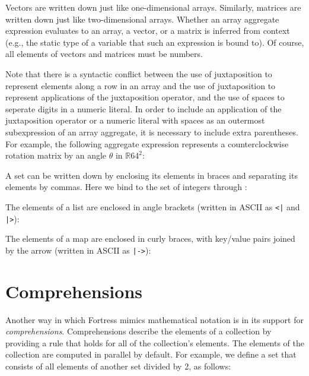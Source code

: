 Vectors are written down just like one-dimensional arrays.
Similarly, matrices are written down just like two-dimensional arrays.
Whether an array aggregate expression evaluates to an array, a vector, or a
matrix is inferred from context
(e.g., the static type of a variable that such an expression is bound to).
Of course, all elements of vectors and matrices must be numbers.

Note that there is a syntactic conflict between the use of juxtaposition to
represent elements along a row in an array and the use of juxtaposition to represent
applications of the juxtaposition operator, and the use of spaces to seperate digits in a numeric literal.
In order to include an application of the juxtaposition operator or a numeric literal with spaces
as an outermost subexpression of an array aggregate, it is necessary to include extra parentheses. For example,
the following aggregate expression represents a counterclockwise rotation matrix by an angle $\theta{}$ in $\mathbb{R}64^2$:




A set can be written down by enclosing its elements in braces and separating its elements by commas.
Here we bind  to the set of integers  through :



The elements of a list are enclosed in angle brackets (written in ASCII as
\verb$<|$ and \verb$|>$):


The elements of a map are enclosed in curly braces, with key/value pairs
joined by the arrow \EXP{\mapsto} (written in ASCII as \verb$|->$):


\section{Comprehensions}
Another way in which Fortress mimics mathematical notation is in its support for
\emph{comprehensions}.  Comprehensions describe the elements of a collection by
providing a rule that holds for all of the collection's elements.  The elements
of the collection are computed in parallel by default.
For example, we define a set  that consists of all elements of another
set  divided by 2, as follows:



